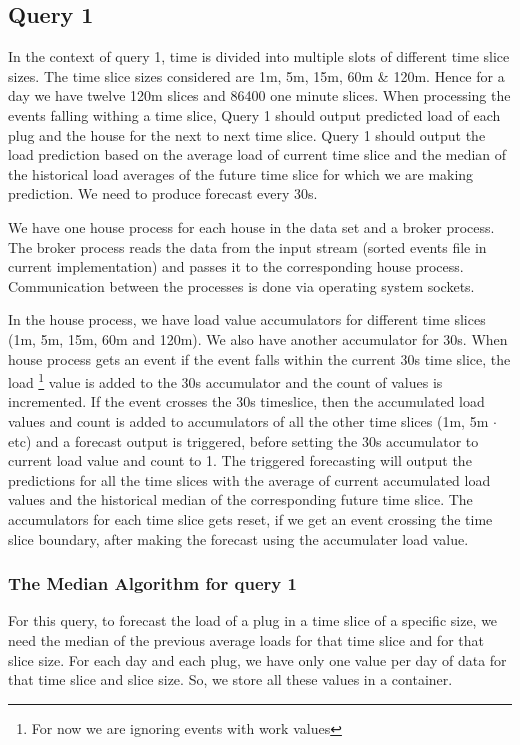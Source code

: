 \subsection{Query 1}
In the context of query 1, time is divided into multiple slots of different time slice sizes. The time slice sizes considered are 1m, 5m, 15m, 60m \& 120m. Hence for a day we have twelve 120m slices and 86400 one minute slices. When processing the events falling withing a time slice, Query 1 should output predicted load of each plug and the house for the next to next time slice. Query 1 should output the load prediction based on the average load of current time slice and the median of the historical load averages of the future time slice for which we are making prediction. We need to produce forecast every 30s.

We have one house process for each house in the data set and a broker process. The broker process reads the data from the input stream (sorted events file in current implementation) and passes it to the corresponding house process. Communication between the processes is done via operating system sockets.

In the house process, we have load value accumulators for different time slices (1m, 5m, 15m, 60m and 120m). We also have another accumulator for 30s. When house process gets an event if the event falls within the current 30s time slice, the load \footnote{For now we are ignoring events with work values} value is added to the 30s accumulator and the count of values is incremented. If the event crosses the 30s timeslice, then the accumulated load values and count is added to accumulators of all the other time slices (1m, 5m $\cdot$ etc) and a forecast output is triggered, before setting the 30s accumulator to current load value and count to 1. The triggered forecasting will output the predictions for all the time slices with the average of current accumulated load values and the historical median of the corresponding future time slice. The accumulators for each time slice gets reset, if we get an event crossing the time slice boundary, after making the forecast using the accumulater load value.


\subsubsection{The Median Algorithm for query 1}
For this query, to forecast the load of a plug in a time slice of a specific size, we need the median of the previous average loads for that time slice and for that slice size. For each day and each plug, we have only one value per day of data for that time slice and slice size. So, we store all these values in a container.

